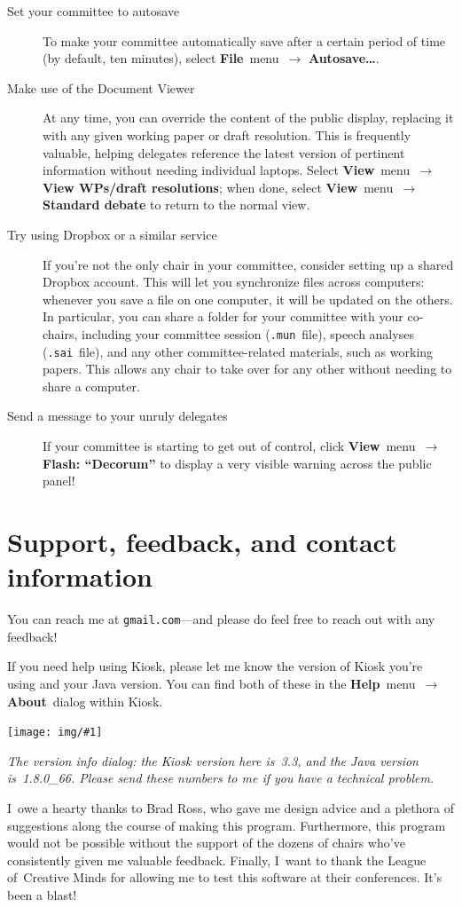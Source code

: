 \documentclass{article}
\newcommand{\navstep}[2]{\navitem{#1}~{#2}~$\rightarrow$}
\newcommand{\navitem}[1]{\textbf{#1}}
\newcommand{\encouragebreak}[1]{\vfil\penalty-#1\vfilneg}
\newcommand{\img}[2]{%
  \begin{center}
    \vspace{6pt}
    \encouragebreak{100}
    \centerline{\texttt{[image: img/\#1]}}
    {\slshape #2}
    \encouragebreak{300}
  \end{center}
}
\begin{document}
\begin{description}
  \item[Set your committee to autosave]
    To make your committee automatically save after a certain period of time (by default, ten minutes), select \navstep{File}{menu} \navitem{Autosave\ldots}.
  \item[Make use of the Document Viewer]
    At any time, you can override the content of the public display, replacing it with any given working paper or draft resolution.
    This is frequently valuable, helping delegates reference the latest version of pertinent information without needing individual laptops.
    Select \navstep{View}{menu} \navitem{View WPs/draft resolutions}; when done, select \navstep{View}{menu} \navitem{Standard debate} to return to the normal view.
  \item[Try using Dropbox or a similar service]
    If you're not the only chair in your committee, consider setting up a shared Dropbox account.
    This will let you synchronize files across computers: whenever you save a file on one computer, it will be updated on the others.
    In particular, you can share a folder for your committee with your co-chairs, including your committee session (\texttt{.mun}~file), speech analyses (\texttt{.sai}~file), and any other committee-related materials, such as working papers.
    This allows any chair to take over for any other without needing to share a computer.
  \item[Send a message to your unruly delegates]
    If your committee is starting to get out of control, click \navstep{View}{menu} \navitem{Flash: ``Decorum''} to display a very visible warning across the public panel!
\end{description}

\section{Support, feedback, and contact information}

\def\emailtld{com}
\def\emaildomain{gmail}
\def\emailuser{wchargin}
You can reach me at \texttt{\emailuser@\emaildomain.\emailtld}---and please do feel free to reach out with any feedback!

If you need help using Kiosk, please let me know the version of Kiosk you're using and your Java version.
You can find both of these in the \navstep{Help}{menu} \navitem{About}~dialog within Kiosk.

\img{version_info}{%
  The version info dialog: the Kiosk version here is~3.3, and the Java version is~1.8.0\_66.
  Please send these numbers to me if you have a technical problem.
}

I~owe a hearty thanks to Brad Ross, who gave me design advice and a plethora of suggestions along the course of making this program.
Furthermore, this program would not be possible without the support of the dozens of chairs who've consistently given me valuable feedback.
Finally, I~want to thank the League of~Creative Minds for allowing me to test this software at their conferences.
It's been a blast!
\end{document}
